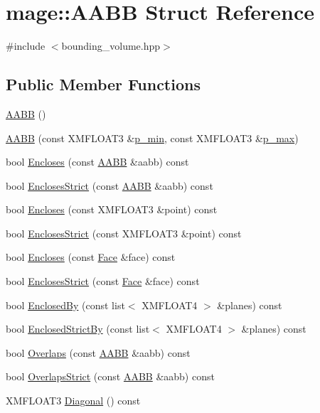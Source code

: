 \hypertarget{structmage_1_1_a_a_b_b}{}\section{mage\+:\+:A\+A\+BB Struct Reference}
\label{structmage_1_1_a_a_b_b}


{\ttfamily \#include $<$bounding\+\_\+volume.\+hpp$>$}

\subsection*{Public Member Functions}
\begin{DoxyCompactItemize}
\item 
\hyperlink{structmage_1_1_a_a_b_b_ae6db94dcb9165eb008f0be8741f0eb62}{A\+A\+BB} ()
\item 
\hyperlink{structmage_1_1_a_a_b_b_ace7530031c44d2343b2b3377e63228d6}{A\+A\+BB} (const X\+M\+F\+L\+O\+A\+T3 \&\hyperlink{structmage_1_1_a_a_b_b_aa3794b223acfd4f9dabccde5ae6ce9fb}{p\+\_\+min}, const X\+M\+F\+L\+O\+A\+T3 \&\hyperlink{structmage_1_1_a_a_b_b_a91ac7c17f1bbd452984a602296f68fba}{p\+\_\+max})
\item 
bool \hyperlink{structmage_1_1_a_a_b_b_a0d6619404376bacf956b4a0c6662696f}{Encloses} (const \hyperlink{structmage_1_1_a_a_b_b}{A\+A\+BB} \&aabb) const
\item 
bool \hyperlink{structmage_1_1_a_a_b_b_a3bb59de6eca634cb3ddec4ad314fde21}{Encloses\+Strict} (const \hyperlink{structmage_1_1_a_a_b_b}{A\+A\+BB} \&aabb) const
\item 
bool \hyperlink{structmage_1_1_a_a_b_b_a6b1d39d7d8473e38d101eb8427301a7d}{Encloses} (const X\+M\+F\+L\+O\+A\+T3 \&point) const
\item 
bool \hyperlink{structmage_1_1_a_a_b_b_aeaae511f26763ce3ed22f841b3f04d95}{Encloses\+Strict} (const X\+M\+F\+L\+O\+A\+T3 \&point) const
\item 
bool \hyperlink{structmage_1_1_a_a_b_b_ab57318f2ea79779ed357a7ecdd101132}{Encloses} (const \hyperlink{structmage_1_1_face}{Face} \&face) const
\item 
bool \hyperlink{structmage_1_1_a_a_b_b_acc5a6584d01c80abf5a59405b21e1a2c}{Encloses\+Strict} (const \hyperlink{structmage_1_1_face}{Face} \&face) const
\item 
bool \hyperlink{structmage_1_1_a_a_b_b_a7d4cd9138aa14aa79fba35a266634dac}{Enclosed\+By} (const list$<$ X\+M\+F\+L\+O\+A\+T4 $>$ \&planes) const
\item 
bool \hyperlink{structmage_1_1_a_a_b_b_a098cdfecc66ce8a1e557280aafda33e3}{Enclosed\+Strict\+By} (const list$<$ X\+M\+F\+L\+O\+A\+T4 $>$ \&planes) const
\item 
bool \hyperlink{structmage_1_1_a_a_b_b_a5a959edc3bc5ccdd29025d612c2e66e3}{Overlaps} (const \hyperlink{structmage_1_1_a_a_b_b}{A\+A\+BB} \&aabb) const
\item 
bool \hyperlink{structmage_1_1_a_a_b_b_ae8e6eca9c5e30015a91ab2e900594bfc}{Overlaps\+Strict} (const \hyperlink{structmage_1_1_a_a_b_b}{A\+A\+BB} \&aabb) const
\item 
X\+M\+F\+L\+O\+A\+T3 \hyperlink{structmage_1_1_a_a_b_b_a0d6ff4f60e3628ab99c2d64477fbe215}{Diagonal} () const
\end{DoxyCompactItemize}
